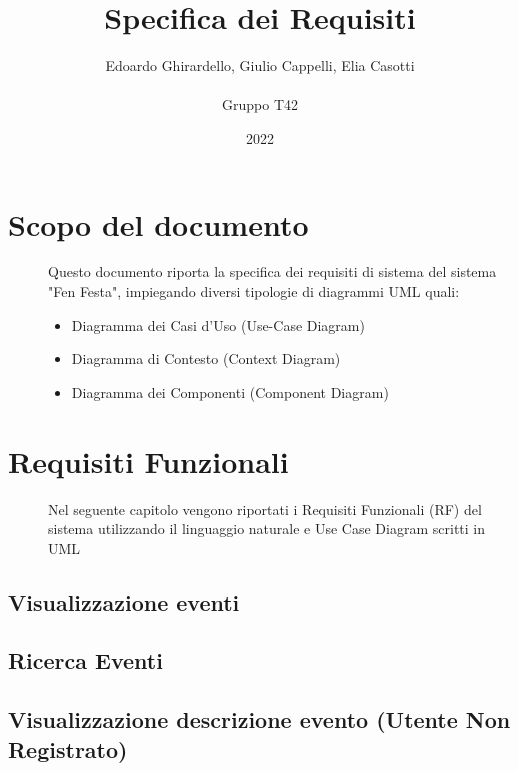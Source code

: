 \documentclass{article}
\title{\textbf{\Huge Specifica dei Requisiti}}
\author{Edoardo Ghirardello, Giulio Cappelli, Elia Casotti \\ \\ Gruppo T42}
\date{2022}
\begin{document}
\maketitle

\clearpage
\tableofcontents
\clearpage

\section{Scopo del documento}
\begin{description}
    \item[] Questo documento riporta la specifica dei requisiti di sistema del sistema "Fen Festa", impiegando diversi tipologie di diagrammi UML quali:
        \begin{itemize}
            \item Diagramma dei Casi d'Uso (Use-Case Diagram)
            \item Diagramma di Contesto (Context Diagram)
            \item Diagramma dei Componenti (Component Diagram)
        \end{itemize}
\end{description}
\clearpage
\section{Requisiti Funzionali}
\begin{description}
    \item[] Nel seguente capitolo vengono riportati i Requisiti Funzionali (RF) del sistema utilizzando il linguaggio naturale e Use Case Diagram scritti in UML
\end{description}
\renewcommand\thesubsection{RF\arabic{subsection}}
\subsection{Visualizzazione eventi}
\subsection{Ricerca Eventi}
\subsection{Visualizzazione descrizione evento (Utente Non Registrato)}
\end{document}
